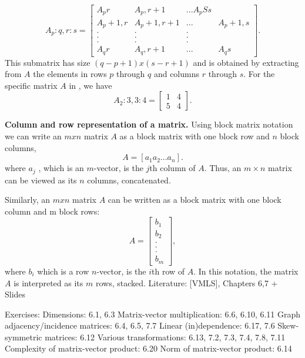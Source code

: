 \documentclass[11pt,oneside,a4paper,openright]{article}
\begin{document}
\begin{equation}
    A_p:q,r:s=\begin{bmatrix}
        A_pr&A_p,r+1&...A_pSs\\
        A_p+1,r&A_p+1,r+1&...&A_p+1,s\\
        .&.&.\\
        .&.&.\\
        .&.&.\\
        A_qr&A_q,r+1&...&A_qs
    \end{bmatrix}.
\end{equation}
This submatrix has size $(q-p+1)x(s-r+1)$ and is obtained by extracting from $A$ the elements
in rows $p$ through $q$ and columns $r$ through $s$.
\newline
For the specific matrix $A$ in \href{6.1}, we have
\begin{equation}
    A_2:3,3:4 = \begin{bmatrix}
        1 & 4\\
        5 & 4
    \end{bmatrix}.
\end{equation}

\textbf{Column and row representation of a matrix.} Using block matrix notation we can write an
$m x n$ matrix $A$ as a block matrix with one block row and $n$ block columns,
\begin{equation}
    A=[a_1 a_2 ... a_n].
\end{equation}
where $a_j$ , which is an $m$-vector, is the $j$th column of $A$. Thus, an $m × n$ matrix
can be viewed as its $n$ columns, concatenated.

Similarly, an $mxn$ matrix $A$ can be written as a block matrix with one block column and m block rows:
\begin{equation}
    A=\begin{bmatrix}
      b_1\\
      b_2\\
      .\\
      .\\
      .\\
      b_m  
    \end{bmatrix},
\end{equation}
where $b_i$ which is a row $n$-vector, is the $i$th row of $A$. In this notation, the matrix $A$
is interpreted as its $m$ rows, stacked.
Literature: [VMLS], Chapters 6,7 + Slides

Exercises:
Dimensions: 6.1, 6.3
Matrix-vector multiplication: 6.6, 6.10, 6.11
Graph adjacency/incidence matrices: 6.4, 6.5, 7.7
Linear (in)dependence: 6.17, 7.6
Skew-symmetric matrices: 6.12
Various transformations: 6.13, 7.2, 7.3, 7.4, 7.8, 7.11
Complexity of matrix-vector product: 6.20
Norm of matrix-vector product: 6.14
\end{document}
